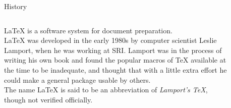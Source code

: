 \documentclass[10pt,xcolor={dvipsnames}, aspectratio=169]{beamer}
\begin{document}
	\begin{frame}{History}
	    \begin{columns}[T]
		    \begin{column}{0.8 \textwidth}
		    \textcolor{latexBird}{\LaTeX} \xspace is a \textcolor{latexBird}{software system} for document preparation. \\
		    \bigskip
            \LaTeX \xspace was developed in the early 1980s by  computer scientist \textcolor{latexBird}{Leslie Lamport}, when he was working at SRI. Lamport was in the process of writing his own book and found the popular macros of \TeX \xspace available at the time to be inadequate, and thought that with a little extra effort he could make a general package usable by others. \\
            \bigskip
		    The name \LaTeX \xspace is said to be an abbreviation of \textit{Lamport's \TeX}\xspace, though not verified officially.
			\end{column}
			\begin{column}{0.2 \textwidth}
			\vspace{0.5cm}
			\begin{figure}
                \captionsetup{justification=centering}
				\caption{Leslie Lamport}
            \end{figure}
			\end{column}
		\end{columns}
	\end{frame}
\end{document}
